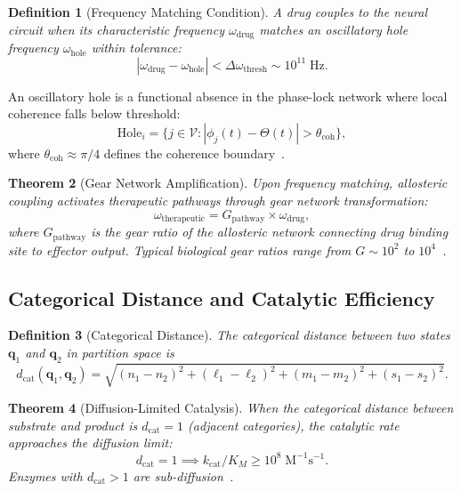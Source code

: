 \documentclass[twocolumn,10pt]{article}
\newtheorem{theorem}{Theorem}[section]
\newtheorem{definition}[theorem]{Definition}
\theoremstyle{remark}
\newcommand{\dcat}{d_{\mathrm{cat}}}
\begin{document}
\begin{definition}[Frequency Matching Condition]
\label{def:freq_match}
A drug couples to the neural circuit when its characteristic frequency $\omega_{\mathrm{drug}}$ matches an oscillatory hole frequency $\omega_{\mathrm{hole}}$ within tolerance:
\begin{equation}
  |\omega_{\mathrm{drug}} - \omega_{\mathrm{hole}}| < \Delta\omega_{\mathrm{thresh}} \sim 10^{11} \;\mathrm{Hz}.
\end{equation}
\end{definition}

An oscillatory hole is a functional absence in the phase-lock network where local coherence falls below threshold:
\begin{equation}
  \mathrm{Hole}_i = \{j \in \mathcal{V} : |\phi_j(t) - \Theta(t)| > \theta_{\mathrm{coh}}\},
\end{equation}
where $\theta_{\mathrm{coh}} \approx \pi/4$ defines the coherence boundary~\citep{buzsaki2006rhythms}.

\begin{theorem}[Gear Network Amplification]
\label{thm:gear}
Upon frequency matching, allosteric coupling activates therapeutic pathways through gear network transformation:
\begin{equation}
  \omega_{\mathrm{therapeutic}} = G_{\mathrm{pathway}} \times \omega_{\mathrm{drug}},
\end{equation}
where $G_{\mathrm{pathway}}$ is the gear ratio of the allosteric network connecting drug binding site to effector output. Typical biological gear ratios range from $G \sim 10^2$ to $10^4$~\citep{hartl2011molecular}.
\end{theorem}

\subsection{Categorical Distance and Catalytic Efficiency}

\begin{definition}[Categorical Distance]
\label{def:dcat}
The categorical distance between two states $\mathbf{q}_1$ and $\mathbf{q}_2$ in partition space is
\begin{equation}
  \dcat(\mathbf{q}_1, \mathbf{q}_2) = \sqrt{(n_1 - n_2)^2 + (\ell_1 - \ell_2)^2 + (m_1 - m_2)^2 + (s_1 - s_2)^2}.
\end{equation}
\end{definition}

\begin{theorem}[Diffusion-Limited Catalysis]
\label{thm:diffusion}
When the categorical distance between substrate and product is $\dcat = 1$ (adjacent categories), the catalytic rate approaches the diffusion limit:
\begin{equation}
  \dcat = 1 \implies k_{\mathrm{cat}}/K_M \geq 10^8 \;\mathrm{M}^{-1}\mathrm{s}^{-1}.
\end{equation}
Enzymes with $\dcat > 1$ are sub-diffusion~\citep{wolfenden2001depth,bar2011diffusion}.
\end{theorem}
\end{document}
